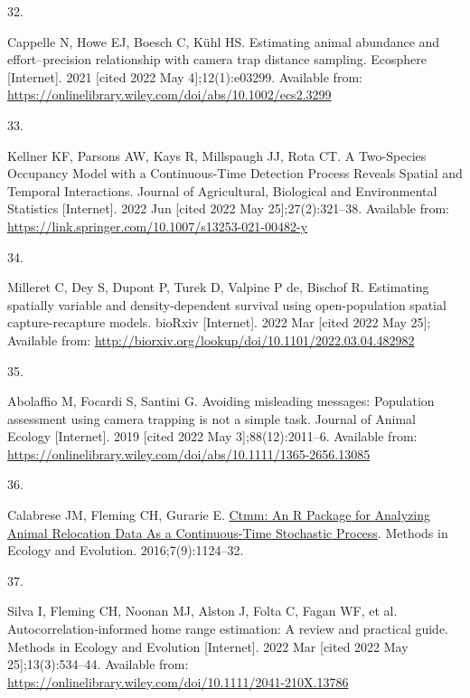 \documentclass[10pt,a4paper]{article}
\newlength{\cslhangindent}
\newlength{\csllabelwidth}
\newlength{\cslentryspacingunit} %
\newenvironment{CSLReferences}[2] %
 {%
  \setlength{\parindent}{0pt}
  \ifodd #1
  \let\oldpar\par
  \def\par{\hangindent=\cslhangindent\oldpar}
  \fi
  \setlength{\parskip}{#2\cslentryspacingunit}
 }%
 {}
\newcommand{\CSLLeftMargin}[1]{\parbox[t]{\csllabelwidth}{#1}}
\newcommand{\CSLRightInline}[1]{\parbox[t]{\linewidth - \csllabelwidth}{#1}\break}
\begin{document}
\begin{CSLReferences}{0}{0}
\leavevmode{}%
\CSLLeftMargin{32. }
\CSLRightInline{Cappelle N, Howe EJ, Boesch C, Kühl HS. Estimating animal abundance and effort--precision relationship with camera trap distance sampling. Ecosphere {[}Internet{]}. 2021 {[}cited 2022 May 4{]};12(1):e03299. Available from: \url{https://onlinelibrary.wiley.com/doi/abs/10.1002/ecs2.3299}}

\leavevmode{}%
\CSLLeftMargin{33. }
\CSLRightInline{Kellner KF, Parsons AW, Kays R, Millspaugh JJ, Rota CT. A {Two}-{Species} {Occupancy} {Model} with a {Continuous}-{Time} {Detection} {Process} {Reveals} {Spatial} and {Temporal} {Interactions}. Journal of Agricultural, Biological and Environmental Statistics {[}Internet{]}. 2022 Jun {[}cited 2022 May 25{]};27(2):321--38. Available from: \url{https://link.springer.com/10.1007/s13253-021-00482-y}}

\leavevmode{}%
\CSLLeftMargin{34. }
\CSLRightInline{Milleret C, Dey S, Dupont P, Turek D, Valpine P de, Bischof R. Estimating spatially variable and density-dependent survival using open-population spatial capture-recapture models. bioRxiv {[}Internet{]}. 2022 Mar {[}cited 2022 May 25{]}; Available from: \url{http://biorxiv.org/lookup/doi/10.1101/2022.03.04.482982}}

\leavevmode{}%
\CSLLeftMargin{35. }
\CSLRightInline{Abolaffio M, Focardi S, Santini G. Avoiding misleading messages: {Population} assessment using camera trapping is not a simple task. Journal of Animal Ecology {[}Internet{]}. 2019 {[}cited 2022 May 3{]};88(12):2011--6. Available from: \url{https://onlinelibrary.wiley.com/doi/abs/10.1111/1365-2656.13085}}

\leavevmode{}%
\CSLLeftMargin{36. }
\CSLRightInline{Calabrese JM, Fleming CH, Gurarie E. \href{https://doi.org/10.1111/2041-210X.12559}{Ctmm: An {R} {Package} for {Analyzing} {Animal} {Relocation} {Data} {As} a {Continuous}-{Time} {Stochastic} {Process}}. Methods in Ecology and Evolution. 2016;7(9):1124--32. }

\leavevmode{}%
\CSLLeftMargin{37. }
\CSLRightInline{Silva I, Fleming CH, Noonan MJ, Alston J, Folta C, Fagan WF, et al. Autocorrelation‐informed home range estimation: {A} review and practical guide. Methods in Ecology and Evolution {[}Internet{]}. 2022 Mar {[}cited 2022 May 25{]};13(3):534--44. Available from: \url{https://onlinelibrary.wiley.com/doi/10.1111/2041-210X.13786}}


\end{CSLReferences}
\end{document}
